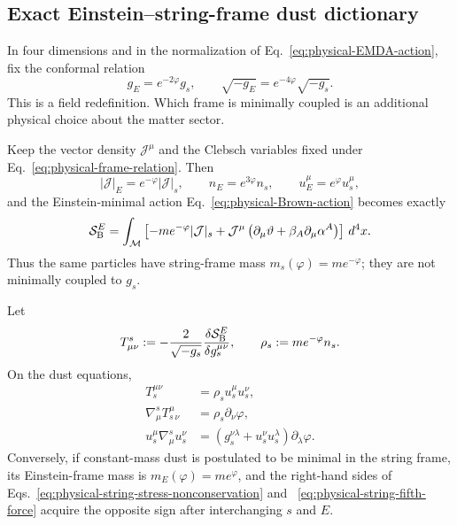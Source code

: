 \subsection{Exact Einstein--string-frame dust dictionary}

In four dimensions and in the normalization of
Eq.~\eqref{eq:physical-EMDA-action}, fix the conformal relation
\begin{equation}
 g_E=e^{-2\varphi}g_s,
 \qquad
 \sqrt{-g_E}=e^{-4\varphi}\sqrt{-g_s}.
 \label{eq:physical-frame-relation}
\end{equation}
This is a field redefinition. Which frame is minimally coupled is an
additional physical choice about the matter sector.

\begin{proposition}
\label{prop:physical-frame-dust}
Keep the vector density $\mathcal J^\mu$ and the Clebsch variables fixed
under Eq.~\eqref{eq:physical-frame-relation}. Then
\begin{equation}
 |\mathcal J|_E=e^{-\varphi}|\mathcal J|_s,
 \qquad
 n_E=e^{3\varphi}n_s,
 \qquad
 u_E^\mu=e^{\varphi}u_s^\mu,
 \label{eq:physical-frame-current-dictionary}
\end{equation}
and the Einstein-minimal action
Eq.~\eqref{eq:physical-Brown-action} becomes exactly
\begin{equation}
 \mathcal S_{\rm B}^{E}
 =\int_{\mathcal M}\left[
 -m e^{-\varphi}|\mathcal J|_s
 +\mathcal J^\mu
 \left(\partial_\mu\vartheta
 +\beta_A\partial_\mu\alpha^A\right)
 \right]\,d^4x.
 \label{eq:physical-string-frame-dust-action}
\end{equation}
Thus the same particles have string-frame mass
$m_s(\varphi)=me^{-\varphi}$; they are not minimally coupled to $g_s$.

Let
\begin{equation}
 T^{s}_{\mu\nu}:=
 -\frac{2}{\sqrt{-g_s}}
 \frac{\delta\mathcal S_{\rm B}^{E}}{\delta g_s^{\mu\nu}},
 \qquad
 \rho_s:=m e^{-\varphi}n_s.
 \label{eq:physical-string-stress-definition}
\end{equation}
On the dust equations,
\begin{align}
 T_s^{\mu\nu}&=\rho_s u_s^\mu u_s^\nu,
 \label{eq:physical-string-dust-stress}\\
 \nabla^s_\mu T_s^{\mu}{}_{\nu}
 &=\rho_s\partial_\nu\varphi,
 \label{eq:physical-string-stress-nonconservation}\\
 u_s^\mu\nabla^s_\mu u_s^\nu
 &=\left(g_s^{\nu\lambda}+u_s^\nu u_s^\lambda\right)
 \partial_\lambda\varphi.
 \label{eq:physical-string-fifth-force}
\end{align}
Conversely, if constant-mass dust is postulated to be minimal in the string
frame, its Einstein-frame mass is $m_E(\varphi)=me^{\varphi}$, and the
right-hand sides of
Eqs.~\eqref{eq:physical-string-stress-nonconservation} and
~\eqref{eq:physical-string-fifth-force} acquire the opposite sign after
interchanging $s$ and $E$.
\end{proposition}

